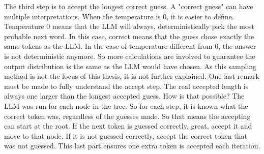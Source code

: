 The third step is to accept the longest correct guess. A "correct guess" can have multiple interpretations. When the temperature is 0, it is easier to define. Temperature 0 means that the LLM will always, deterministically pick the most probable next word. In this case, correct means that the guess chose exactly the same tokens as the LLM. In the case of temperature different from 0, the answer is not deterministic anymore. So more calculations are involved to guarantee the output distribution is the same as the LLM would have chosen. As this sampling method is not the focus of this thesis, it is not further explained. One last remark must be made to fully understand the accept step. The real accepted length is always one larger than the longest accepted guess. How is that possible? The LLM was run for each node in the tree. So for each step, it is known what the correct token was, regardless of the guesses made. So that means the accepting can start at the root. If the next token is guessed correctly, great, accept it and move to that node. If it is not guessed correctly, accept the correct token that was not guessed. This last part ensures one extra token is accepted each iteration.

